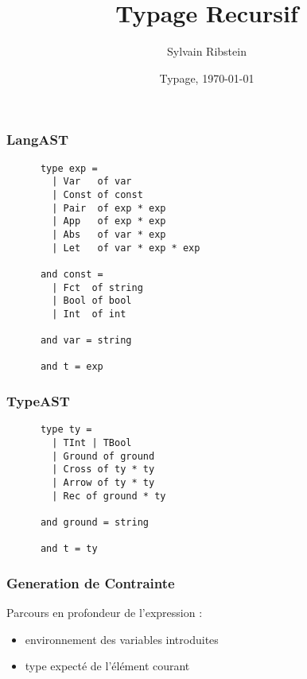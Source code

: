 \documentclass{beamer}
\author{Sylvain Ribstein}
\date{Typage, \today}
\title{Typage Recursif}
\institute[P7]{
  Master 2 de Recherche en Informatique 
  \\Paris 7 - Diderot}
\begin{document}
\frame{\titlepage}


\begin{frame}[fragile]
  \frametitle{LangAST}
  \begin{mdframed}[roundcorner=20pt,backgroundcolor=gray!50]
    \begin{lstlisting}
      type exp =
        | Var   of var 
        | Const of const
        | Pair  of exp * exp
        | App   of exp * exp
        | Abs   of var * exp
        | Let   of var * exp * exp

      and const = 
        | Fct  of string
        | Bool of bool
        | Int  of int 

      and var = string 
        
      and t = exp
    \end{lstlisting}
  \end{mdframed}
\end{frame} 

\begin{frame}[fragile]
  \frametitle{TypeAST}
  \begin{mdframed}[roundcorner=20pt,backgroundcolor=gray!50]
    \begin{lstlisting}
      type ty =
        | TInt | TBool
        | Ground of ground
        | Cross of ty * ty
        | Arrow of ty * ty
        | Rec of ground * ty

      and ground = string
      
      and t = ty
    \end{lstlisting}
  \end{mdframed}
\end{frame} 
\begin{frame}
  \frametitle{Generation de Contrainte}
  Parcours en profondeur de l'expression :
  \begin{itemize}
  \item environnement des variables introduites 
  \item type expecté de l'élément courant 
  \end{itemize}
\end{frame}
\end{document}
